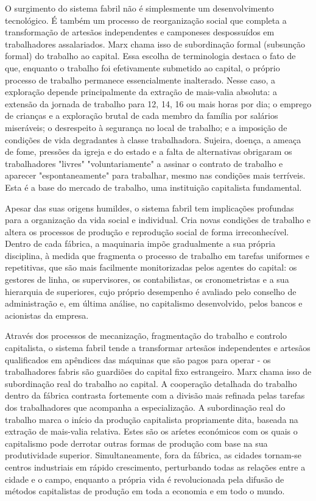  \par 
O surgimento do sistema fabril não é simplesmente um desenvolvimento tecnológico. É também um processo de reorganização social que completa a transformação de artesãos independentes e camponeses despossuídos em trabalhadores assalariados. Marx chama isso de subordinação formal (subsunção formal) do trabalho ao capital. Essa escolha de terminologia destaca o fato de que, enquanto o trabalho foi efetivamente submetido ao capital, o próprio processo de trabalho permanece essencialmente inalterado. Nesse caso, a exploração depende principalmente da extração de mais-valia absoluta: a extensão da jornada de trabalho para 12, 14, {\color{blue}16} ou mais horas por dia; o emprego de crianças e a exploração brutal de cada membro da família por salários miseráveis; o desrespeito à segurança no local de trabalho; e a imposição de condições de vida degradantes à classe trabalhadora. Sujeira, doença, a ameaça de fome, pressões da igreja e do estado e a falta de alternativas obrigaram os trabalhadores "livres" "voluntariamente" a assinar o contrato de trabalho e aparecer "espontaneamente" para trabalhar, mesmo nas condições mais terríveis. Esta é a base do mercado de trabalho, uma instituição capitalista fundamental.
 \par 
Apesar das suas origens humildes, o sistema fabril tem implicações profundas para a organização da vida social e individual. Cria novas condições de trabalho e altera os processos de produção e reprodução social de forma irreconhecível. Dentro de cada fábrica, a maquinaria impõe gradualmente a sua própria disciplina, à medida que fragmenta o processo de trabalho em tarefas uniformes e repetitivas, que são mais facilmente monitorizadas pelos agentes do capital: os gestores de linha, os supervisores, os contabilistas, os cronometristas e a sua hierarquia de superiores, cujo próprio desempenho é avaliado pelo conselho de administração e, em última análise, no capitalismo desenvolvido, pelos bancos e acionistas da empresa.
 \par 
Através dos processos de mecanização, fragmentação do trabalho e controlo capitalista, o sistema fabril tende a transformar artesãos independentes e artesãos qualificados em apêndices das máquinas que são pagos para operar - os trabalhadores fabris são guardiões do capital fixo estrangeiro. Marx chama isso de subordinação real do trabalho ao capital. A cooperação detalhada do trabalho dentro da fábrica contrasta fortemente com a divisão mais refinada pelas tarefas dos trabalhadores que acompanha a especialização. A subordinação real do trabalho marca o início da produção capitalista propriamente dita, baseada na extração de mais-valia relativa. Estes são os aríetes económicos com os quais o capitalismo pode derrotar outras formas de produção com base na sua produtividade superior. Simultaneamente, fora da fábrica, as cidades tornam-se centros industriais em rápido crescimento, perturbando todas as relações entre a cidade e o campo, enquanto a própria vida é revolucionada pela difusão de métodos capitalistas de produção em toda a economia e em todo o mundo.
 \par 
